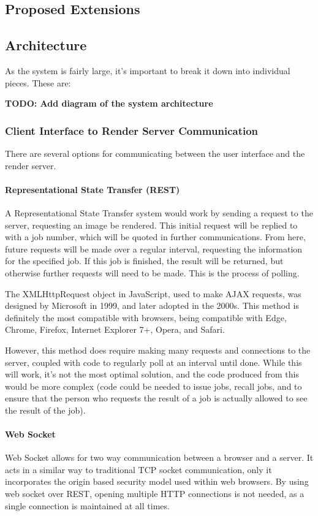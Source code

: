 \documentclass[12pt,a4paper]{article}
\begin{document}
\subsection{Proposed Extensions}

\subsection{Architecture}
As the system is fairly large, it's important to break it down into individual pieces. These are:

\textbf{TODO: Add diagram of the system architecture}
  \subsubsection{Client Interface to Render Server Communication}
There are several options for communicating between the user interface and the render server.

\paragraph{Representational State Transfer (REST)}
A Representational State Transfer system would work by sending a request to the server,
requesting an image be rendered. This initial request will be replied to with a job number,
which will be quoted in further communications. From here, future requests will be made
over a regular interval, requesting the information for the specified job. If this job is finished,
the result will be returned, but otherwise further requests will need to be made. This is the process
of polling.

The XMLHttpRequest object in JavaScript, used to make AJAX requests, was designed by Microsoft
in 1999, and later adopted in the 2000s.
This method is definitely the most compatible with browsers, being compatible with Edge, Chrome,
Firefox, Internet Explorer 7+, Opera, and Safari. \cite{XMLHttpRequestMozilla}

However, this method does require making many requests and connections to the server,
coupled with code to regularly poll at an interval until done. While this will work, it's not the most
optimal solution, and the code produced from this would be more complex (code could be needed to issue jobs, recall jobs,
and to ensure that the person who requests the result of a job is actually allowed to see the result of the job).

\paragraph{Web Socket}
Web Socket allows for two way communication between a browser and a server. It acts in a similar
way to traditional TCP socket communication, only it incorporates the origin based security
model used within web browsers. By using web socket over REST, opening multiple HTTP connections
is not needed, as a single connection is maintained at all times. \cite{WebSocketProtocol}
\end{document}
